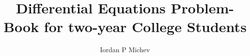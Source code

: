 \documentclass{amsbook}
\theoremstyle{definition}
\theoremstyle{remark}
\numberwithin{section}{chapter}
\numberwithin{equation}{chapter}
\begin{document}
\title{Differential Equations Problem-Book for two-year College Students}
\author{Iordan P Michev}
\address{Mathematics Department, SUNY SCCC, Selden, NY 11784}
\address{AMS Department, Stony Brook University, Stony Brook, NY 11794}
\maketitle

\frontmatter 
\tableofcontents


\mainmatter





\backmatter


\end{document}
